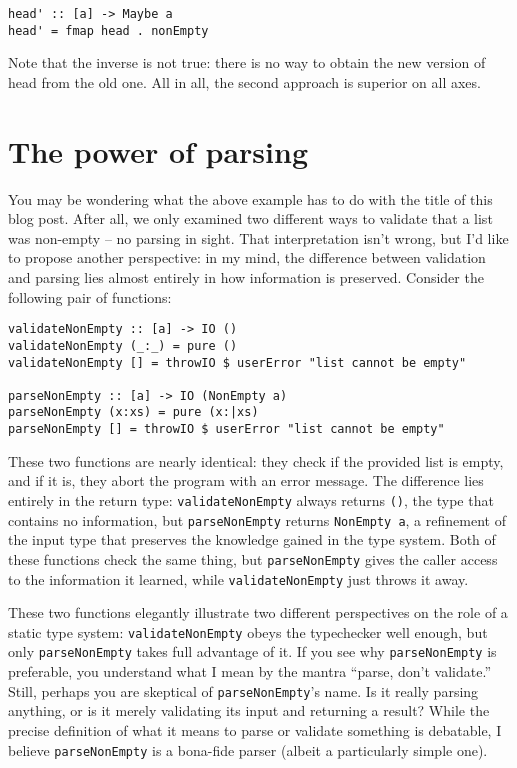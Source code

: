 \begin{verbatim}
head' :: [a] -> Maybe a
head' = fmap head . nonEmpty
\end{verbatim}
Note that the inverse is not true: there is no way to obtain the new version of head from the old one. All in all, the second approach is superior on all axes.


\section{The power of parsing}


You may be wondering what the above example has to do with the title of this blog post. After all, we only examined two different ways to validate that a list was non-empty -- no parsing in sight. That interpretation isn't wrong, but I'd like to propose another perspective: in my mind, the difference between validation and parsing lies almost entirely in how information is preserved. Consider the following pair of functions:

\begin{verbatim}
validateNonEmpty :: [a] -> IO ()
validateNonEmpty (_:_) = pure ()
validateNonEmpty [] = throwIO $ userError "list cannot be empty"

parseNonEmpty :: [a] -> IO (NonEmpty a)
parseNonEmpty (x:xs) = pure (x:|xs)
parseNonEmpty [] = throwIO $ userError "list cannot be empty"
\end{verbatim}
These two functions are nearly identical: they check if the provided list is empty, and if it is, they abort the program with an error message. The difference lies entirely in the return type: \texttt{validateNonEmpty} always returns \texttt{()}, the type that contains no information, but \texttt{parseNonEmpty} returns \texttt{NonEmpty a}, a refinement of the input type that preserves the knowledge gained in the type system. Both of these functions check the same thing, but \texttt{parseNonEmpty} gives the caller access to the information it learned, while \texttt{validateNonEmpty} just throws it away.

These two functions elegantly illustrate two different perspectives on the role of a static type system: \texttt{validateNonEmpty} obeys the typechecker well enough, but only \texttt{parseNonEmpty} takes full advantage of it. If you see why \texttt{parseNonEmpty} is preferable, you understand what I mean by the mantra ``parse, don't validate.'' Still, perhaps you are skeptical of \texttt{parseNonEmpty}'s name. Is it really parsing anything, or is it merely validating its input and returning a result? While the precise definition of what it means to parse or validate something is debatable, I believe \texttt{parseNonEmpty} is a bona-fide parser (albeit a particularly simple one).

